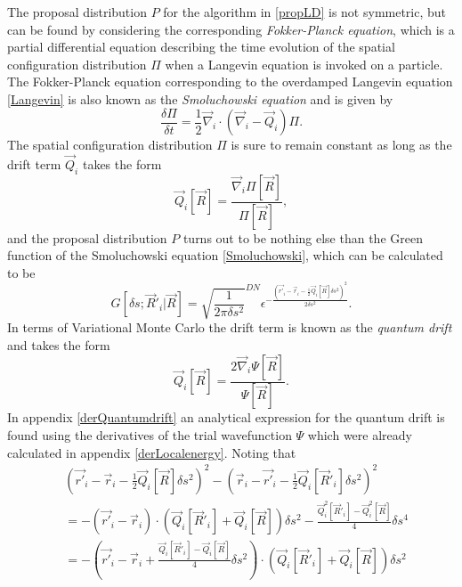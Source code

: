 \documentclass[a4paper,8pt]{article}
\begin{document}
\begin{multicols}{2}
The proposal distribution $P$ for the algorithm in \eqref{propLD} is not symmetric, but can be found by considering the corresponding \textit{Fokker-Planck equation}, which is a partial differential equation describing the time evolution of the spatial configuration distribution $\Pi$ when a Langevin equation is invoked on a particle. The Fokker-Planck equation corresponding to the overdamped Langevin equation \eqref{Langevin} is also known as the \textit{Smoluchowski equation} and is given by
\begin{equation}\label{Smoluchowski}
\frac{\delta\Pi}{\delta t} = \frac{1}{2}\vec{\nabla}_i\cdot\left(\vec{\nabla}_i-\vec{Q}_i\right)\Pi.
\end{equation}
The spatial configuration distribution $\Pi$ is sure to remain constant as long as the drift term $\vec{Q}_i$ takes the form
\begin{equation}
\vec{Q}_i[\vec{R}] = \frac{\vec{\nabla}_i\Pi[\vec{R}]}{\Pi[\vec{R}]},
\end{equation}
and the proposal distribution $P$ turns out to be nothing else than the Green function of the Smoluchowski equation \eqref{Smoluchowski}, which can be calculated to be
\begin{equation}\label{Green}
G[\delta s; \vec{R}'_i|\vec{R}] = \sqrt{\frac{1}{2\pi \delta s^2}}^{DN} \epsilon^{-\frac{\left(\vec{r'}_i-\vec{r}_i-\frac{1}{2}\vec{Q}_i[\vec{R}]\delta s^2\right)^2}{2\delta s^2}}.
\end{equation}
In terms of Variational Monte Carlo the drift term is known as the \textit{quantum drift} and takes the form
\begin{equation}\label{quantumdrift}
\vec{Q}_i[\vec{R}] = \frac{2\vec{\nabla}_i\Psi[\vec{R}]}{\Psi[\vec{R}]}.
\end{equation}
In appendix \ref{derQuantumdrift} an analytical expression for the quantum drift is found using the derivatives of the trial wavefunction $\Psi$ which were already calculated in appendix \ref{derLocalenergy}. Noting that
\begin{align}
&\left(\vec{r'}_i-\vec{r}_i-\frac{1}{2}\vec{Q}_i[\vec{R}]\delta s^2 \right)^2-\left(\vec{r}_i-\vec{r'}_i-\frac{1}{2}\vec{Q}_i[\vec{R}'_i]\delta s^2\right)^2 \nonumber\\
&= -\left(\vec{r'}_i-\vec{r}_i\right) \cdot \left(\vec{Q}_i[\vec{R}'_i]+\vec{Q}_i[\vec{R}]\right)\delta s^2-\frac{\vec{Q}_i^2[\vec{R}'_i]-\vec{Q}_i^2[\vec{R}]}{4}\delta s^4 \nonumber\\
&= -\left(\vec{r'}_i-\vec{r}_i+\frac{\vec{Q}_i[\vec{R}'_i]-\vec{Q}_i[\vec{R}]}{4}\delta s^2\right)\cdot\left(\vec{Q}_i[\vec{R}'_i]+\vec{Q}_i[\vec{R}]\right)\delta s^2 \nonumber

\end{align}
\end{multicols}
\end{document}

